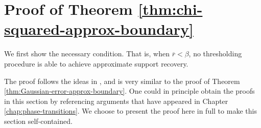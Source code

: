 \section{Proof of Theorem \ref{thm:chi-squared-approx-boundary}}
\label{subsec:proof-chi-squared-approx-boundary}

We first show the necessary condition. 
That is, when $\overline{r} < \beta$, no thresholding procedure is able to achieve approximate support recovery.

The proof follows the ideas in \cite{arias2017distribution}, and is very similar to the proof of Theorem \ref{thm:Gaussian-error-approx-boundary}. 
One could in principle obtain the proofs in this section by referencing arguments that have appeared in Chapter \ref{chap:phase-transitions}.
We choose to present the proof here in full to make this section self-contained.

